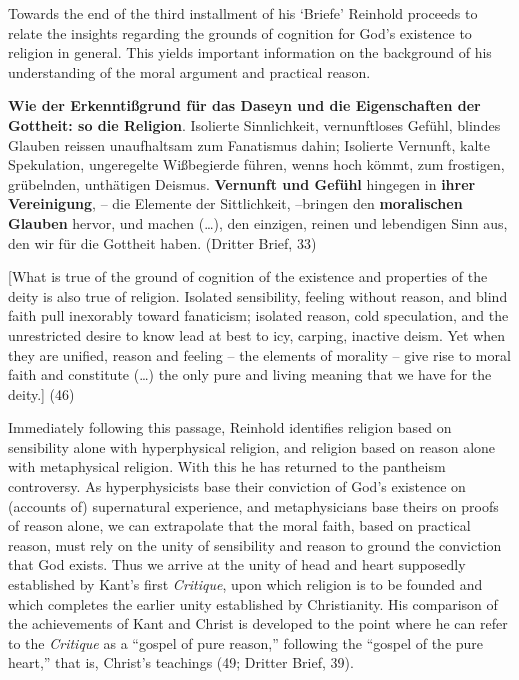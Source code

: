 Towards the end of the third installment of his `Briefe' Reinhold proceeds to relate the insights regarding the grounds of cognition for God's existence to religion in general. This yields important information on the background of his understanding of the moral argument and practical reason. 

\textbf{Wie der Erkennti\ss{}grund f\"{u}r das Daseyn und die Eigenschaften der Gottheit: so die Religion}. Isolierte Sinnlichkeit, vernunftloses Gef\"{u}hl, blindes Glauben reissen unaufhaltsam zum Fanatismus dahin; Isolierte Vernunft, kalte Spekulation, ungeregelte Wi\ss{}begierde f\"{u}hren, wenns hoch k\"{o}mmt, zum frostigen, gr\"{u}belnden, unth\"{a}tigen Deismus. \textbf{Vernunft und Gef\"{u}hl} hingegen in \textbf{ihrer Vereinigung}, {--} die Elemente der Sittlichkeit, {--}bringen den \textbf{moralischen Glauben }hervor, und machen (\ldots ), den einzigen, reinen und lebendigen Sinn aus, den wir f\"{u}r die Gottheit haben. (Dritter Brief, 33)

[What is true of the ground of cognition of the existence and properties of the deity is also true of religion. Isolated sensibility, feeling without reason, and blind faith pull inexorably toward fanaticism; isolated reason, cold speculation, and the unrestricted desire to know lead at best to icy, carping, inactive deism. Yet when they are unified, reason and feeling {--} the elements of morality {--} give rise to moral faith and constitute (\ldots ) the only pure and living meaning that we have for the deity.] (46)

Immediately following this passage, Reinhold identifies religion based on sensibility alone with hyperphysical religion, and religion based on reason alone with metaphysical religion. With this he has returned to the pantheism controversy. As hyperphysicists base their conviction of God's existence on (accounts of) supernatural experience, and metaphysicians base theirs on proofs of reason alone, we can extrapolate that the moral faith, based on practical reason, must rely on the unity of sensibility and reason to ground the conviction that God exists. Thus we arrive at the unity of head and heart supposedly established by Kant's first \textit{Critique}, upon which religion is to be founded and which completes the earlier unity established by Christianity. His comparison of the achievements of Kant and Christ is developed to the point where he can refer to the \textit{Critique }as a ``gospel of pure reason,'' following the ``gospel of the pure heart,'' that is, Christ's teachings (49; Dritter Brief, 39).

